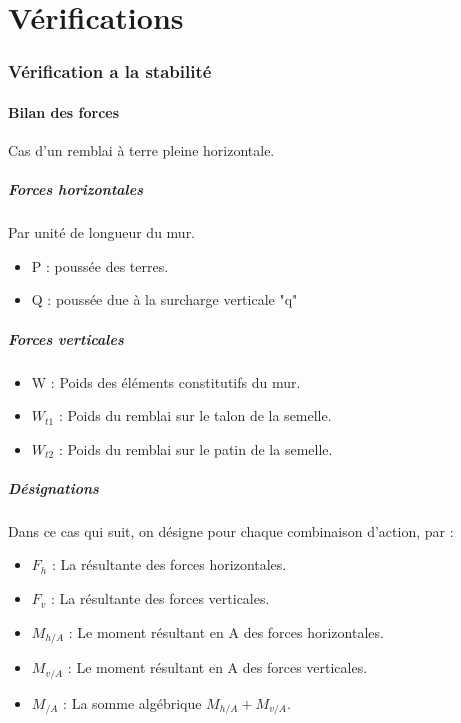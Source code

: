 \documentclass[12pt,a4paper]{article}
\begin{document}
	
	
	
	\part{Vérifications}
	
	
	\section{Vérification a la stabilité}
	
	\subsection{Bilan des forces}
	
	Cas d'un remblai à terre pleine horizontale.
	
	\subsubsection{Forces horizontales}
	
	Par unité de longueur du mur.
	
	\begin{itemize}
		\item P : poussée des terres.
		\item Q : poussée due à la surcharge verticale "q"
	\end{itemize} 
	
	
	\subsubsection{Forces verticales}
	
	\begin{itemize}
		\item W : Poids des éléments constitutifs du mur.
		\item $W_{t1}$ : Poids du remblai sur le talon de la semelle.
		\item $W_{t2}$ : Poids du remblai sur le patin de la semelle.
	\end{itemize}
	
	\subsubsection{Désignations}
	
	Dans ce cas qui suit, on désigne pour chaque combinaison d'action, par :
	
	\begin{itemize}
		\item $F_{h}$ : La résultante des forces horizontales.
		\item $F_{v}$ : La résultante des forces verticales.
		\item $M_{h/A}$ : Le moment résultant en A des forces horizontales.
		\item $M_{v/A}$ : Le moment résultant en A des forces verticales.
		\item $M_{/A}$ : La somme algébrique $M_{h/A} + M_{v/A}$.
	\end{itemize}
	
\end{document}
